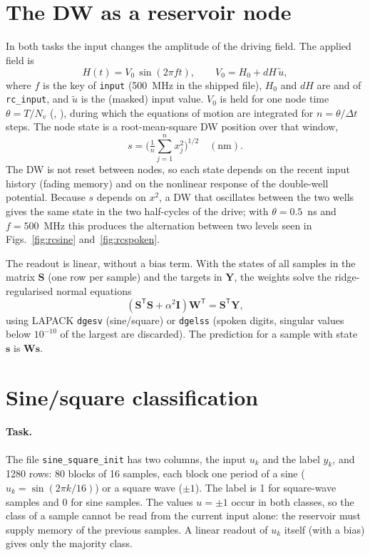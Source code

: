 \documentclass[11pt,a4paper]{report}
\newcommand{\key}[1]{\texttt{\detokenize{#1}}}
\begin{document}
\section{The DW as a reservoir node}\label{sec:rcnode}
In both tasks the input changes the amplitude of the driving field. The applied field is
\begin{equation}
H(t) = V_0\,\sin(2\pi f t), \qquad V_0 = H_0 + dH\,\tilde u ,
\label{eq:rcfield}
\end{equation}
where $f$ is the key \key{f} of \texttt{input} (500~MHz in the shipped file), $H_0$ and $dH$ are \key{H0} and \key{dH} of \texttt{rc\_input}, and $\tilde u$ is the (masked) input value. $V_0$ is held for one node time $\theta = T/N_v$ (\key{T}, \key{Nv}), during which the equations of motion are integrated for $n=\theta/\Delta t$ steps. The node state is a root-mean-square DW position over that window,
\begin{equation}
s = \Big(\tfrac{1}{n}\textstyle\sum_{j=1}^{n} x_j^2\Big)^{1/2}\quad(\text{nm}).
\label{eq:rcstate}
\end{equation}
The DW is not reset between nodes, so each state depends on the recent input history (fading memory) and on the nonlinear response of the double-well potential. Because $s$ depends on $x^2$, a DW that oscillates between the two wells gives the same state in the two half-cycles of the drive; with $\theta = 0.5$~ns and $f=500$~MHz this produces the alternation between two levels seen in Figs.~\ref{fig:rcsine} and~\ref{fig:rcspoken}.

The readout is linear, without a bias term. With the states of all samples in the matrix $\mathbf S$ (one row per sample) and the targets in $\mathbf Y$, the weights solve the ridge-regularised normal equations
\begin{equation}
\left(\mathbf S^{\mathsf T}\mathbf S + \alpha^2\mathbf I\right)\mathbf W^{\mathsf T} = \mathbf S^{\mathsf T}\mathbf Y ,
\label{eq:ridge}
\end{equation}
using LAPACK \texttt{dgesv} (sine/square) or \texttt{dgelss} (spoken digits, singular values below $10^{-10}$ of the largest are discarded). The prediction for a sample with state $\mathbf s$ is $\mathbf W\mathbf s$.

\section{Sine/square classification}\label{sec:rcsine}
\paragraph{Task.} The file \texttt{sine\_square\_init} has two columns, the input $u_k$ and the label $y_k$, and 1280 rows: 80 blocks of 16 samples, each block one period of a sine ($u_k=\sin(2\pi k/16)$) or a square wave ($\pm1$). The label is 1 for square-wave samples and 0 for sine samples. The values $u=\pm1$ occur in both classes, so the class of a sample cannot be read from the current input alone: the reservoir must supply memory of the previous samples. A linear readout of $u_k$ itself (with a bias) gives only the majority class.
\end{document}
